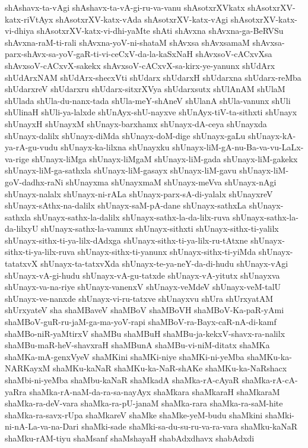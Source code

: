 {shAshavx-ta-vAgi
shAshavx-ta-vA-gi-ru-va-vanu
shAsotxrXVkatx
shAsotxrXV-katx-riVtAyx
shAsotxrXV-katx-vAda
shAsotxrXV-katx-vAgi
shAsotxrXV-katx-vi-dhiya
shAsotxrXV-katx-vi-dhi-yaMte
shAti
shAvxna
shAvxna-ga-BeRVSu
shAvxna-raM-ti-rali
shAvxna-yoV-ni-shataM
shAvxsa
shAvxsamaM
shAvxsa-parx-shAvx-sa-yoV-gaR-ti-vi-ceCxV-da-la-kaSxNaH
shAvxsoV-cACxvXsa
shAvxsoV-cACxvX-sakekx
shAvxsoV-cACxvX-sa-kirx-ye-yanunx
shUdArx
shUdArxNAM
shUdArx-shecxVti
shUdarx
shUdarxH
shUdarxna
shUdarx-reMba
shUdarxreV
shUdarxru
shUdarx-sitxrXVya
shUdarxsutx
shUlAnAM
shUlaM
shUlada
shUla-du-nanx-tada
shUla-meY-shAneV
shUlanA
shUla-vanunx
shUli
shUlinaH
shUli-ya-lalxde
shUnAyx-shU-nayxve
shUnAyx-tiV-ta-sithxti
shUnayx
shUnayxH
shUnayxM
shUnayx-barxhamx
shUnayx-dA-ceya
shUnayxda
shUnayx-dalilx
shUnayx-diMda
shUnayx-doM-dige
shUnayx-gaLu
shUnayx-kA-ya-rA-gu-vudu
shUnayx-ka-lilxna
shUnayxku
shUnayx-liM-gA-nu-Ba-va-vu-LaLx-va-rige
shUnayx-liMga
shUnayx-liMgaM
shUnayx-liM-gada
shUnayx-liM-gakekx
shUnayx-liM-ga-sathxla
shUnayx-liM-gasayx
shUnayx-liM-gavu
shUnayx-liM-goV-dadhx-raNi
shUnayxma
shUnayxmaM
shUnayx-meVva
shUnayx-nAgi
shUnayx-nalalx
shUnayx-ni-rALa
shUnayx-parx-sA-di-yalalx
shUnayxreV
shUnayx-sAthx-na-dalilx
shUnayx-saM-pA-dane
shUnayx-sathxLa
shUnayx-sathxla
shUnayx-sathx-la-dalilx
shUnayx-sathx-la-da-lilx-ruva
shUnayx-sathx-la-da-lilxyU
shUnayx-sathx-la-vanunx
shUnayx-sithxti
shUnayx-sithx-ti-yalilx
shUnayx-sithx-ti-ya-lilx-dAdxga
shUnayx-sithx-ti-ya-lilx-ru-tAtxne
shUnayx-sithx-ti-ya-lilx-ruva
shUnayx-sithx-ti-yanunx
shUnayx-sithx-ti-yiMda
shUnayx-tatatxvX
shUnayx-ta-tatxvXda
shUnayx-te-ya-neY-da-di-hudu
shUnayx-vAgi
shUnayx-vA-gi-hudu
shUnayx-vA-gu-tatxde
shUnayx-vA-yitutx
shUnayxva
shUnayx-va-na-riye
shUnayx-vanenxV
shUnayx-veMdeV
shUnayx-veM-talU
shUnayx-ve-nanxde
shUnayx-vi-ru-tatxve
shUnayxvu
shUra
shUrxyatAM
shUrxyateV
sha
shaMBaveV
shaMBoV
shaMBoVH
shaMBoV-Ka-paR-yAmi
shaMBoV-guR-ru-jaM-ga-ma-yoV-rapi
shaMBoV-ra-Bayx-caR-nA-di-kamf
shaMBo-niR-yaMtirxV
shaMBu
shaMBuH
shaMBu-ja-kekxV-shavx-ra-nalilx
shaMBu-maR-heV-shavxraH
shaMBunA
shaMBu-vi-niM-ditatx
shaMKa
shaMKa-mA-genxVyeV
shaMKini
shaMKi-niye
shaMKi-ni-yeMba
shaMKu-ka-NARKayxM
shaMKu-kaNaR
shaMKu-ka-NaR-shAKe
shaMKu-ka-NaRshacx
shaMbi-ni-yeMba
shaMbu-kaNaR
shaMkadA
shaMka-rA-cAyaR
shaMka-rA-cA-yaRra
shaMka-rA-naM-da-ra-sa-nayAyx
shaMkara
shaMkaraH
shaMkaraM
shaMka-ra-deV-vara
shaMka-ra-pU-janaM
shaMka-rara
shaMka-ra-saM-hite
shaMka-ra-savx-rUpa
shaMkareV
shaMke
shaMke-yeM-budu
shaMkini
shaMki-ni-nA-La-va-na-Dari
shaMki-sade
shaMki-sa-du-su-ru-va-ra-vara
shaMku-kaNaR
shaMku-rAM-tiyu
shaMsanf
shaMshayaH
shabAdxdhavx
shabAdxdi
}

